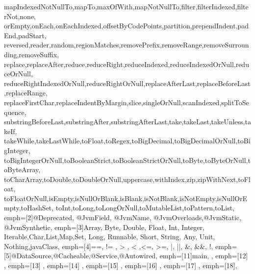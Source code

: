 {{    mapIndexedNotNullTo,mapTo,maxOfWith,mapNotNullTo,filter,filterIndexed,filterNot,none,
    orEmpty,onEach,onEachIndexed,offsetByCodePoints,partition,prependIndent,padEnd,padStart,
    reversed,reader,random,regionMatches,removePrefix,removeRange,removeSurrounding,removeSuffix,
    replace,replaceAfter,reduce,reduceRight,reduceIndexed,reduceIndexedOrNull,reduceOrNull,
    reduceRightIndexedOrNull,reduceRightOrNull,replaceAfterLast,replaceBeforeLast,replaceRange,
    replaceFirstChar,replaceIndentByMargin,slice,singleOrNull,scanIndexed,splitToSequence,
    substringBeforeLast,substringAfter,substringAfterLast,take,takeLast,takeUnless,takeIf,
    takeWhile,takeLastWhile,toFloat,toRegex,toBigDecimal,toBigDecimalOrNull,toBigInteger,
    toBigIntegerOrNull,toBooleanStrict,toBooleanStrictOrNull,toByte,toByteOrNull,toByteArray,
    toCharArray,toDouble,toDoubleOrNull,uppercase,withIndex,zip,zipWithNext,toFloat,
    toFloatOrNull,isEmpty,isNullOrBlank,isBlank,isNotBlank,isNotEmpty,isNullOrEmpty,toHashSet,
    toInt,toLong,toLongOrNull,toMutableList,toPattern,toList},
    emph=[2]{@Deprecated, @JvmField, @JvmName, @JvmOverloads,@JvmStatic, @JvmSynthetic},
    emph=[3]{Array, Byte, Double, Float, Int, Integer, Iterable,Char,List,Map,Set,
    Long, Runnable, Short, String, Any, Unit, Nothing,javaClass},
    emph=[4]{==, != , > , < ,<=, >=, |, ||, \&, \&\&, !},
    emph=[5]{@DataSource,@Cacheable,@Service,@Autowired},
    emph=[11]{main,
    },
    emph=[12]{
    },
    emph=[13]{
    },
    emph=[14]{
    },
    emph=[15]{
    },
    emph=[16]{
    },
    emph=[17]{
    },
    emph=[18]{},
}


